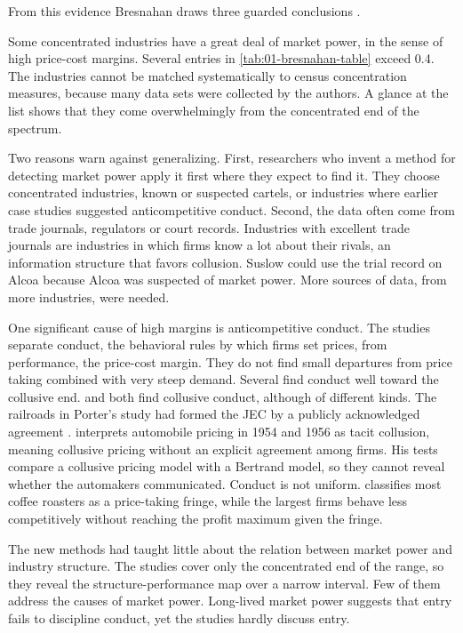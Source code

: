 From this evidence Bresnahan draws three guarded conclusions \citep[pp.~1052--1053]{Bresnahan1989}.

Some concentrated industries have a great deal of market power, in the sense of high price-cost margins. Several entries
in \cref{tab:01-bresnahan-table} exceed 0.4. The industries cannot be matched systematically to census concentration
measures, because many data sets were collected by the authors. A glance at the list shows that they come overwhelmingly
from the concentrated end of the spectrum.

Two reasons warn against generalizing. First, researchers who invent a method for detecting market power apply it first
where they expect to find it. They choose concentrated industries, known or suspected cartels, or industries where earlier
case studies suggested anticompetitive conduct. Second, the data often come from trade journals, regulators or court records.
Industries with excellent trade journals are industries in which firms know a lot about their rivals, an information
structure that favors collusion. Suslow could use the trial record on Alcoa because Alcoa was suspected of market power.
More sources of data, from more industries, were needed.

One significant cause of high margins is anticompetitive conduct. The studies separate conduct, the behavioral rules by
which firms set prices, from performance, the price-cost margin. They do not find small departures from price taking
combined with very steep demand. Several find conduct well toward the collusive end. \citet{Porter1983} and \citet{Bresnahan1987}
both find collusive conduct, although of different kinds. The railroads in Porter's study had formed the JEC by a
publicly acknowledged agreement \citep[p.~302]{Porter1983}. \citet[pp.~457 and 479]{Bresnahan1987} interprets automobile
pricing in 1954 and 1956 as tacit collusion, meaning collusive pricing without an explicit agreement among firms. His
tests compare a collusive pricing model with a Bertrand model, so they cannot reveal whether the automakers
communicated. Conduct is not uniform. \citet{Roberts1984} classifies most
coffee roasters as a price-taking fringe, while the largest firms behave less competitively without reaching the profit
maximum given the fringe.

The new methods had taught little about the relation between market power and industry structure. The studies cover only
the concentrated end of the range, so they reveal the structure-performance map over a narrow interval. Few of them
address the causes of market power. Long-lived market power suggests that entry fails to discipline conduct, yet the
studies hardly discuss entry.

